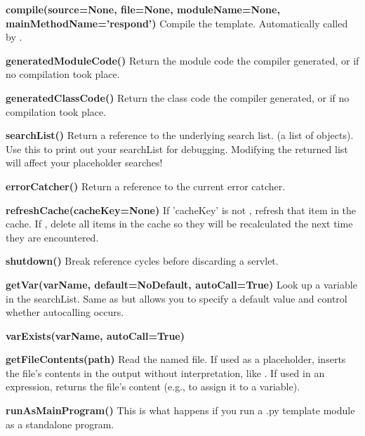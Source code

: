 \begin{description}
\item{{\bf compile(source=None, file=None, moduleName=None, 
    mainMethodName='respond')}}  Compile the template.  Automatically called
    by .
\item{{\bf generatedModuleCode()}}  Return the module code the compiler
    generated, or  if no compilation took place.
\item{{\bf generatedClassCode()}}   Return the class code the compiler
    generated, or  if no compilation took place.
\item{{\bf * searchList()}}  Return a reference to the underlying search list.
    (a list of objects).  Use this to print out your searchList for debugging.
    Modifying the returned list will affect your placeholder searches!
\item{{\bf * errorCatcher()}}  Return a reference to the current error
    catcher.
\item{{\bf * refreshCache(cacheKey=None)}}  If 'cacheKey' is not ,
    refresh that item in the cache.  If , delete all items in the
    cache so they will be recalculated the next time they are encountered.
\item{{\bf * shutdown()}}  Break reference cycles before discarding a servlet.
\item{{\bf * getVar(varName, default=NoDefault, autoCall=True)}}  Look up a
    variable in the searchList.  Same as  but allows you to
    specify a default value and control whether autocalling occurs.
\item{{\bf * varExists(varName, autoCall=True)}}
\item{{\bf * getFileContents(path)}}  Read the named file.  If used as a
    placeholder, inserts the file's contents in the output without
    interpretation, like .  If used in an expression,
    returns the file's content (e.g., to assign it to a variable).
\item{{\bf runAsMainProgram()}}  This is what happens if you run a
    .py template module as a standalone program.
\end{description}

